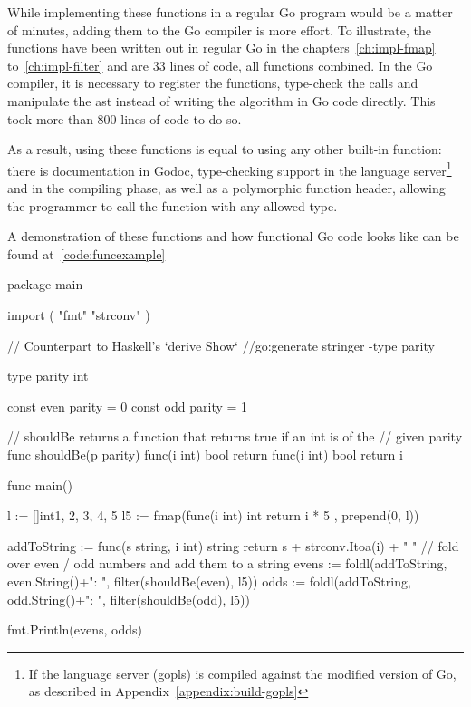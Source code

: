 While implementing these functions in a regular Go program would be a matter of minutes,
adding them to the Go compiler is more effort. To illustrate, the functions
have been written out in regular Go in the chapters~\ref{ch:impl-fmap} to~\ref{ch:impl-filter}
and are 33 lines of code, all functions combined. In the Go compiler, it is necessary to
register the functions, type-check the calls and manipulate the \gls{ast} instead of writing
the algorithm in Go code directly. This took more than 800 lines of code to do so.

As a result, using these functions is equal to using any other built-in function: there
is documentation in Godoc, type-checking support in the language server\footnote{If the
language server (gopls) is compiled against the modified version of Go, as
described in Appendix~\ref{appendix:build-gopls}}
and in the compiling phase, as well as a polymorphic function header, allowing the
programmer to call the function with any allowed type.

A demonstration of these functions and how functional Go code looks like can be found at~\ref{code:funcexample}

\begin{listing}[ht]
\begin{code}
	\label{code:funcexample}
\begin{gocode}
package main

import (
        "fmt"
        "strconv"
)

// Counterpart to Haskell's `derive Show`
//go:generate stringer -type parity

type parity int

const even parity = 0
const odd parity = 1

// shouldBe returns a function that returns true if an int is of the
// given parity
func shouldBe(p parity) func(i int) bool {
        return func(i int) bool {
                return i%
        }
}

func main() {
        l := []int{1, 2, 3, 4, 5}
        l5 := fmap(func(i int) int { return i * 5 }, prepend(0, l))

        addToString := func(s string, i int) string {
                return s + strconv.Itoa(i) + " "
        }
        // fold over even / odd numbers and add them to a string
        evens := foldl(addToString, even.String()+": ",
                filter(shouldBe(even), l5))
        odds := foldl(addToString, odd.String()+": ",
                filter(shouldBe(odd), l5))

        fmt.Println(evens, odds)
}
\end{gocode}
\end{code}
\end{listing}

